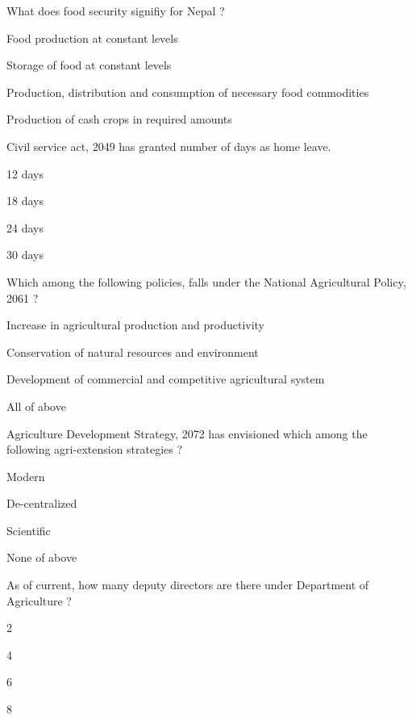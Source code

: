 \begin{questions}
\question What does food security signifiy for Nepal ?
  \begin{items}
  \item Food production at constant levels
  \item Storage of food at constant levels
  \item* Production, distribution and consumption of necessary food commodities
  \item Production of cash crops in required amounts
  \end{items}

\question Civil service act, 2049 has granted \fillin[][3cm] number of days as home leave.
  \begin{items}
  \item 12 days
  \item 18 days
  \item 24 days
  \item* 30 days
  \end{items}

\question Which among the following policies, falls under the National Agricultural Policy, 2061 ?
  \begin{items}
  \item Increase in agricultural production and productivity
  \item Conservation of natural resources and environment
  \item Development of commercial and competitive agricultural system
  \item* All of above
  \end{items}

\question Agriculture Development Strategy, 2072 has envisioned which among the following agri-extension strategies ?
  \begin{items}
  \item Modern
  \item* De-centralized
  \item Scientific
  \item None of above
  \end{items}

\question As of current, how many deputy directors are there under Department of Agriculture ?
  \begin{items}
  \item 2
  \item* 4
  \item 6
  \item 8
  \end{items}


\end{questions}

